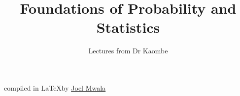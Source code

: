 \documentclass[12pt]{report}
\title{Foundations of Probability and Statistics}
\author{Lectures from Dr Kaombe}
\theoremstyle{myParagraph}
\theoremstyle{examplestyle}
\begin{document}
\maketitle
\vspace*{5cm}
\begin{center}
    compiled in \LaTeX \nobreakspace by \href{https://bento.me/joelmwala}{\underline{Joel Mwala}}
\end{center}

\newpage
\tableofcontents


\newpage


\end{document}

